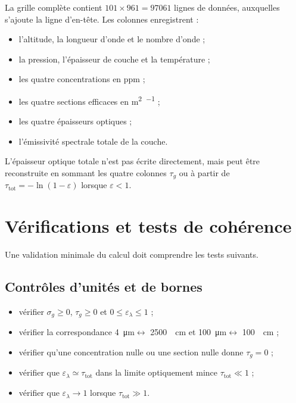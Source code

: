 \documentclass[11pt,a4paper]{article}
\begin{document}
La grille complète contient $101\times961=97061$ lignes de données, auxquelles
s'ajoute la ligne d'en-tête. Les colonnes enregistrent :

\begin{itemize}[itemsep=2pt]
  \item l'altitude, la longueur d'onde et le nombre d'onde ;
  \item la pression, l'épaisseur de couche et la température ;
  \item les quatre concentrations en ppm ;
  \item les quatre sections efficaces en
        \si{\metre\squared\per\molecule} ;
  \item les quatre épaisseurs optiques ;
  \item l'émissivité spectrale totale de la couche.
\end{itemize}

L'épaisseur optique totale n'est pas écrite directement, mais peut être
reconstruite en sommant les quatre colonnes $\tau_g$ ou à partir de
$\tau_{\mathrm{tot}}=-\ln(1-\varepsilon)$ lorsque $\varepsilon<1$.

\section{Vérifications et tests de cohérence}

Une validation minimale du calcul doit comprendre les tests suivants.

\subsection{Contrôles d'unités et de bornes}

\begin{itemize}
  \item vérifier $\sigma_g\geq0$, $\tau_g\geq0$ et
        $0\leq\varepsilon_\lambda\leq1$ ;
  \item vérifier la correspondance
        \SI{4}{\micro\metre}$\leftrightarrow$
        \SI{2500}{\per\centi\metre} et
        \SI{100}{\micro\metre}$\leftrightarrow$
        \SI{100}{\per\centi\metre} ;
  \item vérifier qu'une concentration nulle ou une section nulle donne
        $\tau_g=0$ ;
  \item vérifier que $\varepsilon_\lambda\simeq\tau_{\mathrm{tot}}$ dans la
        limite optiquement mince $\tau_{\mathrm{tot}}\ll1$ ;
  \item vérifier que $\varepsilon_\lambda\to1$ lorsque
        $\tau_{\mathrm{tot}}\gg1$.
\end{itemize}
\end{document}

